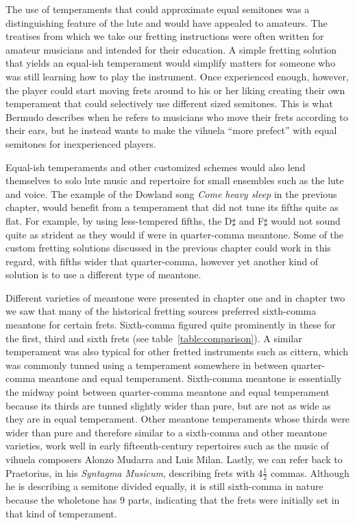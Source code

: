 The use of temperaments that could approximate equal semitones was a distinguishing
feature of the lute and would have appealed to amateurs. The treatises from which we
take our fretting instructions were often written for amateur musicians and intended
for their education. A simple fretting solution that yields an equal-ish temperament
would simplify matters for someone who was still learning how to play the instrument.
Once experienced enough, however, the player could start moving frets around to his or
her liking creating their own temperament that could selectively use different sized
semitones. This is what Bermudo describes when he refers to musicians who move their
frets according to their ears, but he instead wants to make the vihuela ``more
prefect'' with equal semitones for inexperienced players.\autocite[78]{DE:1}

Equal-ish temperaments and other customized schemes would also lend themselves to solo
lute music and repertoire for small ensembles such as the lute and voice. The example
of the Dowland song \textit{Come heavy sleep} in the previous chapter, would benefit
from a temperament that did not tune its fifths quite as flat.  For example, by using
less-tempered fifths, the D$\sharp$ and F$\sharp$ would not sound quite as strident as
they would if were in quarter-comma meantone. Some of the custom fretting solutions
discussed in the previous chapter could work in this regard, with fifths wider that
quarter-comma, however yet another kind of solution is to use a different type of
meantone.

Different varieties of meantone were presented in chapter one and in chapter two we saw
that many of the historical fretting sources preferred sixth-comma meantone for certain
frets.   Sixth-comma figured quite prominently in these for the first, third and sixth
frets (see table~\ref{table:comparison}). A similar temperament was also typical for
other fretted instruments such as cittern, which was commonly tunned using a
temperament somewhere in between quarter-comma meantone and equal temperament.
\autocite[12]{PF:1}  Sixth-comma meantone is essentially the midway point between
quarter-comma meantone and equal temperament because its thirds are tunned slightly
wider than pure, but are not as wide as they are in equal temperament. Other meantone
temperaments whose thirds were wider than pure and therefore similar to a sixth-comma
and other meantone varieties, work well in early fifteenth-century repertoires such as
the music of vihuela composers Alonzo Mudarra and Luis Milan.\autocite[56]{WH:1}
Lastly, we can refer back to Praetorius, in his \textit{Syntagma Musicum}, describing
frets with 4$ \frac{1}{2} $ commas.\autocite[68]{MP:1} Although he is describing a
semitone divided equally, it is still sixth-comma in nature because the wholetone has 9
parts, indicating that the frets were initially set in that kind of temperament.

